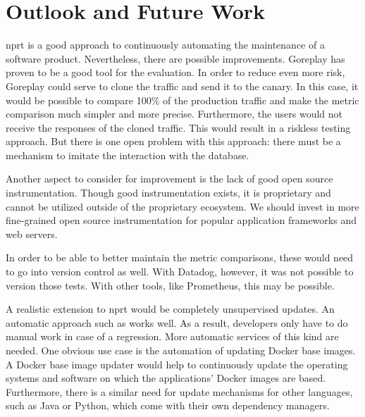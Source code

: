 \section{Outlook and Future Work}

\gls{nprt} is a good approach to continuously automating the maintenance of a software
product. Nevertheless, there are possible improvements. Goreplay has proven to be a good
tool for the evaluation. In order to reduce even more risk, Goreplay could serve to clone
the traffic and send it to the canary. In this case, it would be possible to compare 100\%
of the production traffic and make the metric comparison much simpler and more
precise. Furthermore, the users would not receive the responses of the cloned
traffic. This would result in a riskless testing approach. But there is one open problem
with this approach: there must be a mechanism to imitate the interaction with the
database.

Another aspect to consider for improvement is the lack of good open source
instrumentation. Though good instrumentation exists, it is proprietary and cannot be
utilized outside of the proprietary ecosystem. We should invest in more fine-grained open
source instrumentation for popular application frameworks and web servers.

In order to be able to better maintain the metric comparisons, these would need to go into
version control as well. With Datadog, however, it was not possible to version those tests.
With other tools, like Prometheus, this may be possible.

A realistic extension to \gls{nprt} would be completely unsupervised updates. An automatic
approach such as \gemupdater{} works well. As a result, developers only have to do manual
work in case of a regression.  More automatic services of this kind are needed. One
obvious use case is the automation of updating Docker base images. A Docker base image
updater would help to continuously update the operating systems and software on which the
applications' Docker images are based. Furthermore, there is a similar need for update
mechanisms for other languages, such as Java or Python, which come with their own
dependency managers.
